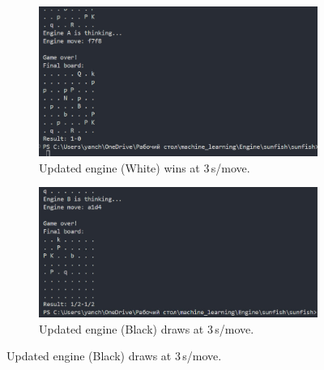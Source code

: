 \documentclass[12pt,a4paper]{article}
\begin{document}
\begin{figure}[H]
    \centering
    
    \begin{subfigure}[b]{0.49\textwidth}
        \centering
        \includegraphics[width=\textwidth]{figures/yanfishwhitemv3000.png}
        \caption{Updated engine (White) wins at 3\,s/move.}
        \label{fig:screenshot1}
        
        \vspace{0.5em}

    \end{subfigure}
    \hfill
    \begin{subfigure}[b]{0.49\textwidth}
        \centering
        \includegraphics[width=\textwidth]{figures/yanfishblackmv3000.png}
        \caption{Updated engine (Black) draws at 3\,s/move.}
        \label{fig:screenshot2}
        
        \vspace{0.5em}

    \end{subfigure}
    

\end{figure}
\end{document}
